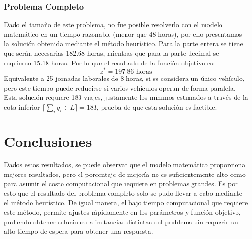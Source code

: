 \documentclass{amsart}
\begin{document}
            \subsubsection{Problema Completo}
            Dado el tamaño de este problema, no fue posible resolverlo con el modelo matemático en un tiempo razonable (menor que 48 horas), por ello presentamos la solución obtenida mediante el método heurístico.
            Para la parte entera se tiene que serán necesarias 182.68 horas, mientras que para la parte decimal se requieren 15.18 horas. Por lo que el resultado de la función objetivo es:
            \[z^* = 197.86 \text{ horas}\]
            Equivalente a 25 jornadas laborales de 8 horas, si se considera un único vehículo, pero este tiempo puede reducirse si varios vehículos operan de forma paralela. Esta solución requiere 183 viajes, justamente los mínimos estimados a través de la cota inferior $\lceil \sum_{i} q_i \div L \rceil = 183$, prueba de que esta solución es factible.

    \section{Conclusiones}
    Dados estos resultados, se puede observar que el modelo matemático proporciona mejores resultados, pero el porcentaje de mejoría no es suficientemente alto como para asumir el costo computacional que requiere en problemas grandes. Es por esto que el resultado del problema completo solo se pudo llevar a cabo mediante el método heurístico. De igual manera, el bajo tiempo computacional que requiere este método, permite ajustes rápidamente en los parámetros y función objetivo, pudiendo obtener soluciones a instancias distintas del problema sin requerir un alto tiempo de espera para obtener una respuesta.
    
\end{document}
